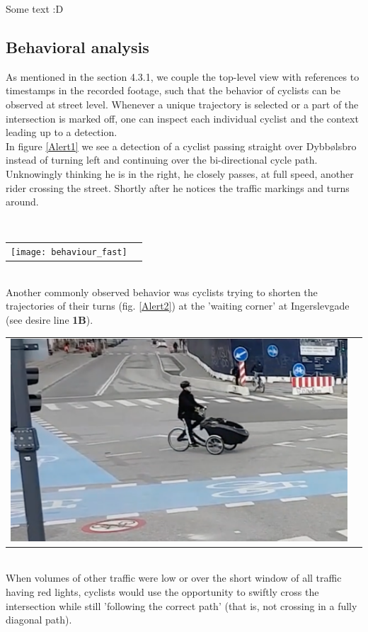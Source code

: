 Some text :D 
\ \\

\subsection{Behavioral analysis}
As mentioned in the section 4.3.1, we couple the top-level view with references to timestamps in the recorded footage, 
such that the behavior of cyclists can be observed at street level.
Whenever a unique trajectory is selected or a part of the intersection is marked off, one can inspect each individual cyclist 
and the context leading up to a detection.
\\

In figure \ref{Alert1} we see a detection of a cyclist passing straight over Dybbølsbro instead of turning left and 
continuing over the bi-directional cycle path. Unknowingly thinking he is in the right, he closely passes, at full speed, another rider crossing
the street. Shortly after he notices the traffic markings and turns around. 

\ \\ 
\raggedbottom
\begin{tabular}{@{}cc}
\texttt{[image: behaviour\_fast]} 
\end{tabular}
\label{Alert1}
\ \\

Another commonly observed behavior was cyclists trying to shorten the trajectories of their turns (fig. \ref{Alert2})
at the 'waiting corner' at Ingerslevgade (see desire line \textbf{1B}).

\raggedbottom
\begin{tabular}{@{}cc}
\includegraphics[width=1.0\columnwidth]{shorten_traj} 
\end{tabular}
\label{Alert2}
\ \\

When volumes of other traffic were low or over the short window of all traffic having red lights, cyclists would use the opportunity 
to swiftly cross the intersection while still 'following the correct path' (that is, not crossing in a fully diagonal path). 


